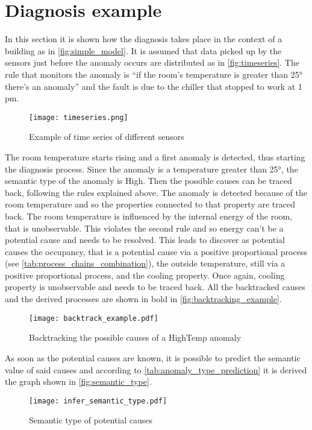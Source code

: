 \section{Diagnosis example}
In this section it is shown how the diagnosis takes place in the context of a building as in \autoref{fig:simple_model}. It is assumed that data picked up by the sensors just before the anomaly occurs are distributed as in \autoref{fig:timeseries}. The rule that monitors the anomaly is ``if the room's temperature is greater than \ang{25} there's an anomaly'' and the fault is due to the chiller that stopped to work at 1 pm.
\begin{figure}
  \centering
  \texttt{[image: timeseries.png]}
  \caption{Example of time series of different sensors}
  \label{fig:timeseries}
\end{figure}
The room temperature starts rising and a first anomaly is detected, thus starting the diagnosis process.
Since the anomaly is a temperature greater than \ang{25}, the semantic type of the anomaly is High. Then the possible causes can be traced back, following the rules explained above. The anomaly is detected because of the room temperature and so the properties connected to that property are traced back. The room temperature is influenced by the internal energy of the room, that is unobservable. This violates the second rule and so energy can't be a potential cause and needs to be resolved. This leads to discover as potential causes the occupancy, that is a potential cause via a positive proportional process (see \autoref{tab:process_chains_combination}), the outside temperature, still via a positive proportional process, and the cooling property. Once again, cooling property is unobservable and needs to be traced back.
All the backtracked causes and the derived processes are shown in bold in \autoref{fig:backtracking_example}.
\begin{figure}
  \texttt{[image: backtrack\_example.pdf]}
  \caption{Backtracking the possible causes of a HighTemp anomaly}
  \label{fig:backtracking_example}
\end{figure}
As soon as the potential causes are known, it is possible to predict the semantic value of said causes and according to \autoref{tab:anomaly_type_prediction} it is derived the graph shown in \autoref{fig:semantic_type}.
\begin{figure}
  \centering
  \texttt{[image: infer\_semantic\_type.pdf]}
  \caption{Semantic type of potential causes}
  \label{fig:semantic_type}
\end{figure}
